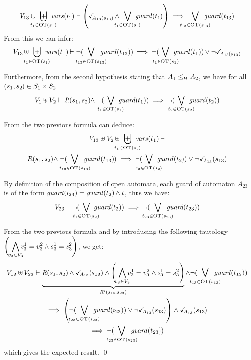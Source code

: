 \documentclass[runningheads]{llncs}
\begin{document}
\begin{enumerate}
\begin{multline*}
V_{13} \uplus \biguplus_\subbox{t_1 \in \fOT{s_1}} \fvars{t_1}  \vdash  \left(\reach{A_{13}(s_{13})} \land \bigvee_\subbox{t_1 \in \fOT{s_1}} \fguard{t_1}\right) \implies \bigvee_\subbox{t_{13} \in \fOT{s_{13}}} \fguard{t_{13}}
\end{multline*}
From this we can infer:
\begin{multline*}
V_{13}  \uplus \biguplus_\subbox{t_1 \in \fOT{s_1}} \fvars{t_1} \vdash  \neg(\bigvee_\subbox{t_{13} \in \fOT{s_{13}}} \fguard{t_{13}})  \implies   \neg(\bigvee_\subbox{t_1 \in \fOT{s_1}} \fguard{t_1}) \lor 
\neg{\reach{A_{13}(s_{13})}}
\end{multline*}

Furthermore, from the second  hypothesis  stating that $\wrel{A_1}{A_2}{H}$,  we have for all  $\mpar{s_1, s_2} \in S_1 \times S_2$ 
\begin{multline*}
V_1 \uplus V_2 \vdash R\mpar{s_1, s_2} \nwedge \neg (\bigvee_\subbox{t_1 \in \fOT{s_1}} \fguard{t_1}) \implies   \neg(\bigvee_\subbox{t_2 \in \fOT{s_2}} \fguard{t_2})
\end{multline*}

From the two previous formula can deduce:
\begin{multline*}
V_{13} \uplus V_2 \uplus \biguplus_\subbox{t_1 \in \fOT{s_1}} \fvars{t_1} \vdash\\ R\mpar{s_1, s_2} \nwedge \neg(\bigvee_\subbox{t_{13} \in \fOT{s_{13}}} \fguard{t_{13}})  \implies   \neg(\bigvee_\subbox{t_2 \in \fOT{s_2}} \fguard{t_2}) 
\lor \neg{\reach{A_{13}}(s_{13}) }
\end{multline*}

By definition of the composition of open automata, each guard of automaton 
 $A_{23}$ is of the form $\fguard{t_{23}} = \fguard{t_{2}}\land t$,  thus we have:
\begin{multline*}
V_{23}   \vdash \neg(\bigvee_\subbox{t_1 \in \fOT{s_2}} \fguard{t_2}) \implies \neg(\bigvee_\subbox{t_{23} \in \fOT{s_{23}}} \fguard{t_{23}})
\end{multline*}

From the two previous formula and by introducing the following tautology\\ $ \mpar{\,\,\displaystyle \bigwedge_\subbox{v_3\in V_3} v^1_3=v^2_3\wedge s^1_3 = s^2_3}$, we get: 
\begin{multline*}
V_{13} \uplus V_{23}  \vdash  \underbrace{R\mpar{s_1, s_2} \wedge \reach{A_{13}}(s_{13}) \land \mpar{\,\,\bigwedge_\subbox{v_3\in V_3}  v^1_3=v^2_3 \wedge s^1_3=s^2_3}}_{R^{\prime}(s_{13},s_{23})} \wedge \neg(\bigvee_\subbox{t_{13} \in \fOT{s_{13}}} \fguard{t_{13}})   \\ \implies \left(\neg(\bigvee_\subbox{t_{23} \in \fOT{s_{23}}} \fguard{t_{23}}) \lor \neg{\reach{A_{13}}(s_{13}) }\right) \land \reach{A_{13}}(s_{13})\\
\implies \neg(\bigvee_\subbox{t_{23} \in \fOT{s_{23}}} \fguard{t_{23}})
\end{multline*}
which gives the expected result. \qed
\end{enumerate}
\end{document}
